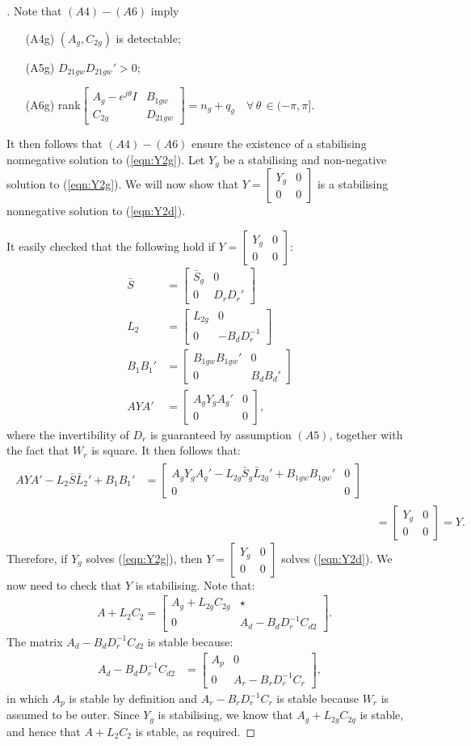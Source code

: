 \documentclass[a4paper,12pt]{article}
\newenvironment{pf}[1][\proofname]
{\begin{proof}[\proofname]}
{\end{proof}}
\theoremstyle{remark}
\newcommand{\ma}[1]{\begin{bmatrix} #1 \end{bmatrix}}
\newcommand{\als}[1]{\begin{align*} #1 \end{align*}}
\newcommand{\aln}[1]{\begin{align} #1 \end{align}}
\newcommand{\spl}[1]{\begin{split} #1 \end{split}}
\begin{document}
\begin{pf}
Note that $(A4)-(A6)$ imply 
\begin{itemize}
\item[(A4g)] $(A_g,C_{2g})$ is detectable; 
\item[(A5g)] $D_{21gw}D_{21gw}'>0$;
\item[(A6g)] rank$\ma{A_g-e^{j\theta}I&B_{1gw}\\C_{2g}& D_{21gw}}=n_g+q_g\quad \forall\, \theta \,\in (-\pi,\pi]$.
\end{itemize}
%
It then follows that $(A4)-(A6)$ ensure the existence of a stabilising nonnegative solution to (\ref{eqn:Y2g}). 
Let $Y_g$ be a stabilising and non-negative solution to (\ref{eqn:Y2g}). We will now show that $Y=\ma{Y_g&0\\0&0}$ is a stabilising nonnegative solution to (\ref{eqn:Y2d}).

It easily checked that the following hold if $Y=\ma{Y_g&0\\0&0}$:
\aln{
\bar S&=\ma{\bar S_g & 0\\0& D_rD_r'}\nonumber\\
L_2&=\ma{L_{2g} &0\\0& -B_dD_r^{-1}}\label{eqn:L2struct}\\
B_1B_1'&=\ma{ B_{1gw}B_{1gw}' & 0\\0& B_dB_d'}\nonumber\\
AYA'&= \ma{A_gY_gA_g'  &0 \\0 &0}\nonumber
,}
where the invertibility of $D_r$ is guaranteed by assumption $(A5)$, together with the fact that $W_r$ is square. It then follows that:
\als{
\spl{AYA'-L_2 {\bar S}\bar L_2'+B_1B_1'&=\ma{A_gY_gA_g'-L_{2g} {\bar S_g}\bar L_{2g}'+B_{1gw}B_{1gw}'&0\\0&0}}\\
&=\ma{Y_g&0\\0&0}=Y.
}
Therefore, if $Y_g$ solves (\ref{eqn:Y2g}), then $Y=\ma{Y_g&0\\0&0}$ solves (\ref{eqn:Y2d}). We now need to check that $Y$ is stabilising. Note that:
\als{
&A+L_2C_2=\ma{A_g+L_{2g}C_{2g}&\star\\0&A_d-B_dD_r^{-1}C_{d2}}.
}
The matrix $A_d-B_dD_r^{-1}C_{d2}$ is stable because:
\aln{
A_d-B_dD_r^{-1}C_{d2}&=\ma{A_p&0\\0&A_r-B_rD_r^{-1}C_r}\label{eqn:AdBdDrCd2},
}
in which $A_p$ is stable by definition and $A_r-B_rD_r^{-1}C_r$ is stable because $W_r$ is assumed to be outer. Since $Y_g$ is stabilising, we know that $A_g+L_{2g}C_{2g}$ is stable, and hence that $A+L_2C_2$ is stable, as required. 
 \end{pf}
\end{document}
